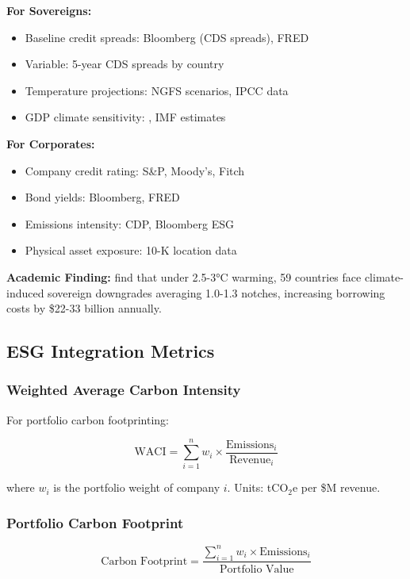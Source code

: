 \documentclass[11pt,a4paper]{article}
\begin{document}
\textbf{For Sovereigns:}
\begin{itemize}
    \item Baseline credit spreads: Bloomberg (CDS spreads), FRED
    \item Variable: 5-year CDS spreads by country
    \item Temperature projections: NGFS scenarios, IPCC data
    \item GDP climate sensitivity: \citet{Kotz2024}, IMF estimates
\end{itemize}

\textbf{For Corporates:}
\begin{itemize}
    \item Company credit rating: S\&P, Moody's, Fitch
    \item Bond yields: Bloomberg, FRED
    \item Emissions intensity: CDP, Bloomberg ESG
    \item Physical asset exposure: 10-K location data
\end{itemize}

\textbf{Academic Finding:} \citet{Klusak2023} find that under 2.5-3°C warming, 59 countries face climate-induced sovereign downgrades averaging 1.0-1.3 notches, increasing borrowing costs by \$22-33 billion annually.

\subsection{ESG Integration Metrics}

\subsubsection{Weighted Average Carbon Intensity}

For portfolio carbon footprinting:

\begin{equation}
\text{WACI} = \sum_{i=1}^{n} w_i \times \frac{\text{Emissions}_i}{\text{Revenue}_i}
\end{equation}

where $w_i$ is the portfolio weight of company $i$. Units: tCO$_2$e per \$M revenue.

\subsubsection{Portfolio Carbon Footprint}

\begin{equation}
\text{Carbon Footprint} = \frac{\sum_{i=1}^{n} w_i \times \text{Emissions}_i}{\text{Portfolio Value}}
\end{equation}
\end{document}
